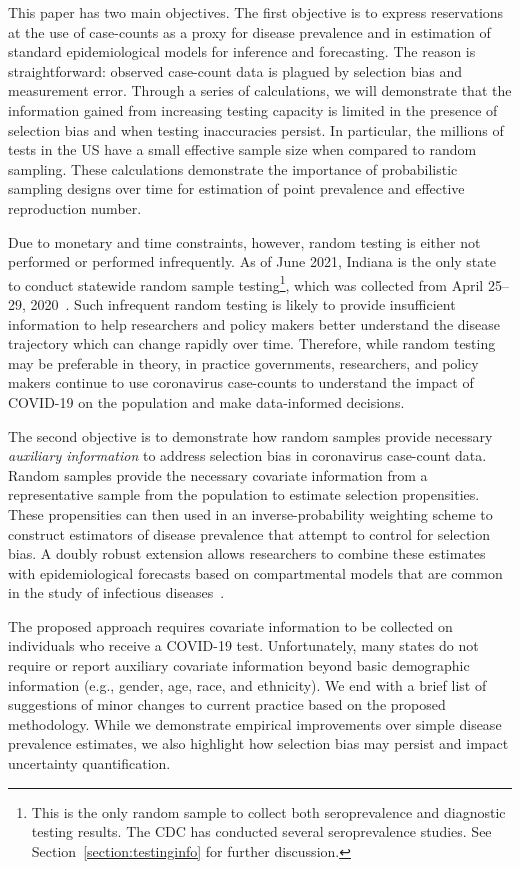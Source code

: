 \documentclass[11pt]{amsart}
\numberwithin{equation}{section}
\theoremstyle{plain}
\begin{document}
This paper has two main objectives.  The first objective is to express reservations at the use of case-counts as a proxy for disease prevalence and in estimation of standard epidemiological models for inference and forecasting.  The reason is straightforward: observed case-count data is plagued by selection bias and measurement error. Through a series of calculations, we will demonstrate that the information gained from increasing testing capacity is limited in the presence of selection bias and when testing inaccuracies persist.  In particular, the millions of tests in the US have a small effective sample size when compared to random sampling. These calculations demonstrate the importance of probabilistic sampling designs over time for estimation of point prevalence and effective reproduction number.

Due to monetary and time constraints, however, random testing is either not performed or performed infrequently.  As of June 2021, Indiana is the only state to conduct statewide random sample testing\footnote{This is the only random sample to collect both seroprevalence and diagnostic testing results. The CDC has conducted several seroprevalence studies. See Section~\ref{section:testinginfo} for further discussion.}, which was collected from April 25--29, 2020~\citep{Yiannoutsos2021}.  Such infrequent random testing is likely to provide insufficient information to help researchers and policy makers better understand the disease trajectory which can change rapidly over time.  Therefore, while random testing may be preferable in theory, in practice governments, researchers, and policy makers continue to use coronavirus case-counts to understand the impact of COVID-19 on the population and make data-informed decisions.

The second objective is to demonstrate how random samples provide necessary \emph{auxiliary information} to address selection bias in coronavirus case-count data.  Random samples provide the necessary covariate information from a representative sample from the population to estimate selection propensities. These propensities can then used in an inverse-probability weighting scheme to construct estimators of disease prevalence that attempt to control for selection bias.  A doubly robust extension allows researchers to combine these estimates with epidemiological forecasts based on compartmental models that are common in the study of infectious diseases~\cite{Hao2020,Song2020,Ray2020,Johndrow2020}.

The proposed approach requires covariate information to be collected on individuals who receive a COVID-19 test.  Unfortunately, many states do not require or report auxiliary covariate information beyond basic demographic information (e.g., gender, age, race, and ethnicity).  We end with a brief list of suggestions of minor changes to current practice based on the proposed methodology. While we demonstrate empirical improvements over simple disease prevalence estimates, we also highlight how selection bias may persist and impact uncertainty quantification.
\end{document}
